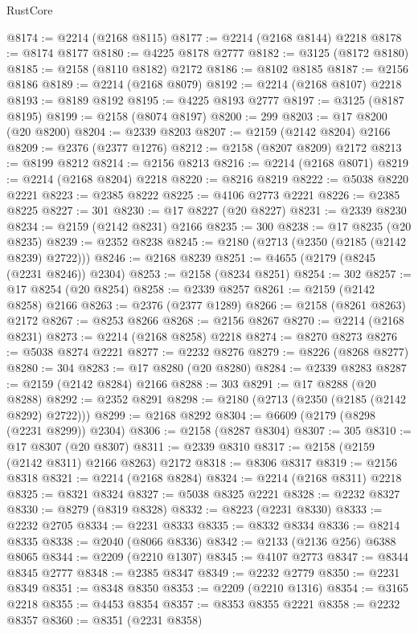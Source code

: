 \begin{lexlean}{RustCore}
\begin{coremodule}
@8174 := @2214 (@2168 @8115)
@8177 := @2214 (@2168 @8144) @2218
@8178 := @8174 @8177
@8180 := @4225 @8178 @2777
@8182 := @3125 (@8172 @8180)
@8185 := @2158 (@8110 @8182) @2172
@8186 := @8102 @8185
@8187 := @2156 @8186
@8189 := @2214 (@2168 @8079)
@8192 := @2214 (@2168 @8107) @2218
@8193 := @8189 @8192
@8195 := @4225 @8193 @2777
@8197 := @3125 (@8187 @8195)
@8199 := @2158 (@8074 @8197)
@8200 := 299
@8203 := @17 @8200 (@20 @8200)
@8204 := @2339 @8203
@8207 := @2159 (@2142 @8204) @2166
@8209 := @2376 (@2377 @1276)
@8212 := @2158 (@8207 @8209) @2172
@8213 := @8199 @8212
@8214 := @2156 @8213
@8216 := @2214 (@2168 @8071)
@8219 := @2214 (@2168 @8204) @2218
@8220 := @8216 @8219
@8222 := @5038 @8220 @2221
@8223 := @2385 @8222
@8225 := @4106 @2773 @2221
@8226 := @2385 @8225
@8227 := 301
@8230 := @17 @8227 (@20 @8227)
@8231 := @2339 @8230
@8234 := @2159 (@2142 @8231) @2166
@8235 := 300
@8238 := @17 @8235 (@20 @8235)
@8239 := @2352 @8238
@8245 := @2180 (@2713 (@2350 (@2185 (@2142 @8239) @2722)))
@8246 := @2168 @8239
@8251 := @4655 (@2179 (@8245 (@2231 @8246)) @2304)
@8253 := @2158 (@8234 @8251)
@8254 := 302
@8257 := @17 @8254 (@20 @8254)
@8258 := @2339 @8257
@8261 := @2159 (@2142 @8258) @2166
@8263 := @2376 (@2377 @1289)
@8266 := @2158 (@8261 @8263) @2172
@8267 := @8253 @8266
@8268 := @2156 @8267
@8270 := @2214 (@2168 @8231)
@8273 := @2214 (@2168 @8258) @2218
@8274 := @8270 @8273
@8276 := @5038 @8274 @2221
@8277 := @2232 @8276
@8279 := @8226 (@8268 @8277)
@8280 := 304
@8283 := @17 @8280 (@20 @8280)
@8284 := @2339 @8283
@8287 := @2159 (@2142 @8284) @2166
@8288 := 303
@8291 := @17 @8288 (@20 @8288)
@8292 := @2352 @8291
@8298 := @2180 (@2713 (@2350 (@2185 (@2142 @8292) @2722)))
@8299 := @2168 @8292
@8304 := @6609 (@2179 (@8298 (@2231 @8299)) @2304)
@8306 := @2158 (@8287 @8304)
@8307 := 305
@8310 := @17 @8307 (@20 @8307)
@8311 := @2339 @8310
@8317 := @2158 (@2159 (@2142 @8311) @2166 @8263) @2172
@8318 := @8306 @8317
@8319 := @2156 @8318
@8321 := @2214 (@2168 @8284)
@8324 := @2214 (@2168 @8311) @2218
@8325 := @8321 @8324
@8327 := @5038 @8325 @2221
@8328 := @2232 @8327
@8330 := @8279 (@8319 @8328)
@8332 := @8223 (@2231 @8330)
@8333 := @2232 @2705
@8334 := @2231 @8333
@8335 := @8332 @8334
@8336 := @8214 @8335
@8338 := @2040 (@8066 @8336)
@8342 := @2133 (@2136 @256) @6388 @8065
@8344 := @2209 (@2210 @1307)
@8345 := @4107 @2773
@8347 := @8344 @8345 @2777
@8348 := @2385 @8347
@8349 := @2232 @2779
@8350 := @2231 @8349
@8351 := @8348 @8350
@8353 := @2209 (@2210 @1316)
@8354 := @3165 @2218
@8355 := @4453 @8354
@8357 := @8353 @8355 @2221
@8358 := @2232 @8357
@8360 := @8351 (@2231 @8358)

\end{coremodule}
\end{lexlean}
